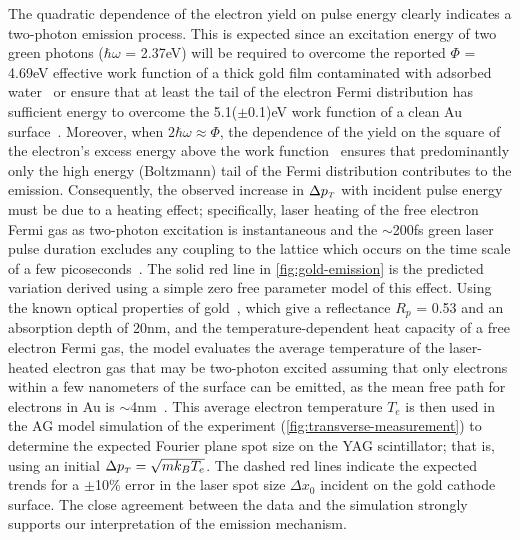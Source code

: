 The quadratic dependence of the electron yield on pulse energy clearly indicates a two-photon emission process.
This is expected since an excitation energy of two green photons ($\hbar \omega$ = 2.37eV) will be required to overcome the reported $\Phi$ = 4.69eV effective work function of a thick gold film contaminated with adsorbed water~\cite{monjushiro_ultraviolet_1991} or ensure that at least the tail of the electron Fermi distribution has sufficient energy to overcome the 5.1($\pm$0.1)eV work function of a clean Au surface~\cite{eastman_photoelectric_1970}.
Moreover, when $2\hbar \omega \approx \Phi$, the dependence of the yield on the square of the electron's excess energy above the work function~\cite{monjushiro_ultraviolet_1991} ensures that predominantly only the high energy (Boltzmann) tail of the Fermi distribution contributes to the emission.
Consequently, the observed increase in $\Delta p_{{\scriptscriptstyle T}}$ with incident pulse energy must be due to a heating effect; specifically, laser heating of the free electron Fermi gas as two-photon excitation is instantaneous and the $\sim$200fs green laser pulse duration excludes any coupling to the lattice which occurs on the time scale of a few picoseconds~\cite{chen_semiclassical_2006}.
The solid red line in \ref{fig:gold-emission} is the predicted variation derived using a simple zero free parameter model of this effect.
Using the known optical properties of gold~\cite{johnson_optical_1972}, which give a reflectance $R_p$ = 0.53 and an absorption depth of 20nm, and the temperature-dependent heat capacity of a free electron Fermi gas, the model evaluates the average temperature of the laser-heated electron gas that may be two-photon excited assuming that only electrons within a few nanometers of the surface can be emitted, as the mean free path for electrons in Au is $\sim$4nm~\cite{seah_quantitative_1979}.
This average electron temperature $T_e$ is then used in the AG model simulation of the experiment (\ref{fig:transverse-measurement}) to determine the expected Fourier plane spot size on the YAG scintillator; that is, using an initial $\Delta p_{{\scriptscriptstyle T}} = \sqrt{m k_B T_e}$.  The dashed red lines indicate the expected trends for a $\pm$10\% error in the laser spot size $\Delta x_0$ incident on the gold cathode surface.
The close agreement between the data and the simulation strongly supports our interpretation of the emission mechanism.
